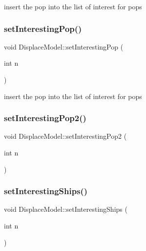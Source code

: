 insert the pop into the list of interest for pops 

\mbox{\label{class_displace_model_ab1f5d05b68eba34d7aa680e840829b2a}} 
\subsubsection{\texorpdfstring{setInterestingPop()}{setInterestingPop()}}
{\footnotesize\ttfamily void Displace\+Model\+::set\+Interesting\+Pop (\begin{DoxyParamCaption}\item[{int}]{n }\end{DoxyParamCaption})}



insert the pop into the list of interest for pops 

\mbox{\label{class_displace_model_a7bd445e07f5ff0cc06dc533edee7d9b1}} 
\subsubsection{\texorpdfstring{setInterestingPop2()}{setInterestingPop2()}}
{\footnotesize\ttfamily void Displace\+Model\+::set\+Interesting\+Pop2 (\begin{DoxyParamCaption}\item[{int}]{n }\end{DoxyParamCaption})}

\mbox{\label{class_displace_model_a922238bb83478cd594889eeeffb68914}} 
\subsubsection{\texorpdfstring{setInterestingShips()}{setInterestingShips()}}
{\footnotesize\ttfamily void Displace\+Model\+::set\+Interesting\+Ships (\begin{DoxyParamCaption}\item[{int}]{n }\end{DoxyParamCaption})\hspace{0.3cm}{\ttfamily [inline]}}

